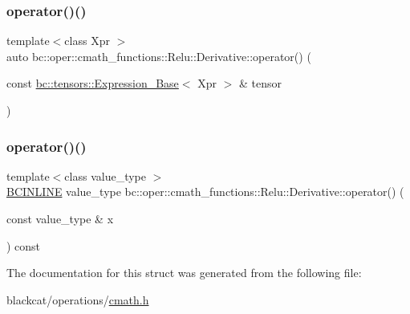 \mbox{\label{structbc_1_1oper_1_1cmath__functions_1_1Relu_1_1Derivative_a3338bc87cd35a4ed1922dde76bcdea04}} 
\subsubsection{\texorpdfstring{operator()()}{operator()()}\hspace{0.1cm}{\footnotesize\ttfamily [2/3]}}
{\footnotesize\ttfamily template$<$class Xpr $>$ \\
auto bc\+::oper\+::cmath\+\_\+functions\+::\+Relu\+::\+Derivative\+::operator() (\begin{DoxyParamCaption}\item[{const \hyperlink{classbc_1_1tensors_1_1Expression__Base}{bc\+::tensors\+::\+Expression\+\_\+\+Base}$<$ Xpr $>$ \&}]{tensor }\end{DoxyParamCaption})\hspace{0.3cm}{\ttfamily [inline]}}

\mbox{\label{structbc_1_1oper_1_1cmath__functions_1_1Relu_1_1Derivative_a712d32c1263ad15951d8eff665e15cac}} 
\subsubsection{\texorpdfstring{operator()()}{operator()()}\hspace{0.1cm}{\footnotesize\ttfamily [3/3]}}
{\footnotesize\ttfamily template$<$class value\+\_\+type $>$ \\
\hyperlink{common_8h_a6699e8b0449da5c0fafb878e59c1d4b1}{B\+C\+I\+N\+L\+I\+NE} value\+\_\+type bc\+::oper\+::cmath\+\_\+functions\+::\+Relu\+::\+Derivative\+::operator() (\begin{DoxyParamCaption}\item[{const value\+\_\+type \&}]{x }\end{DoxyParamCaption}) const\hspace{0.3cm}{\ttfamily [inline]}}



The documentation for this struct was generated from the following file\+:\begin{DoxyCompactItemize}
\item 
blackcat/operations/\hyperlink{cmath_8h}{cmath.\+h}\end{DoxyCompactItemize}
